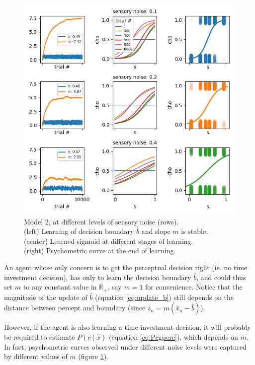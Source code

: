 \begin{figure}[h!]
    \centering
    \includegraphics[width=.8\linewidth]{dual2afc/myplot3.png}
    \caption{Model 2, at different levels of sensory noise (rows). \\
    (left) Learning of decision boundary $\hat{b}$ and slope $m$ is stable. \\
    (center) Learned sigmoid at different stages of learning. \\
    (right) Psychometric curve at the end of learning.}
    \label{fig:mod3}
\end{figure}

An agent whose only concern is to get the perceptual decision right (ie. no time investment decision), has only to learn the decision boundary $\hat{b}$, and could thus set $m$ to any constant value in $\mathbb{R}_+$, say $m=1$ for convenience.
Notice that the magnitude of the update of $\hat{b}$ (equation \ref{eq:update_b}) still depends on the distance between percept and boundary (since  $z_n = m(\hat{x}_n-\hat{b})$).

However, if the agent is also learning a time investment decision, it will probably be required to estimate $P(c \mid \hat{x})$ (equation \ref{eq:Pcgperc}), which depends on $m$.
In fact, psychometric curves observed under different noise levels were captured by different values of $m$  (figure \ref{fig:mod3}).

